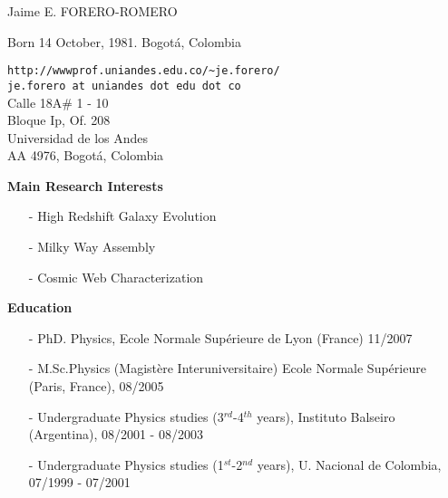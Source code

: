 \documentclass[9pt]{article}
\begin{document}
\noindent

\noindent
{{\Large Jaime E. FORERO-ROMERO}}\\
\begin{flushleft}
Born 14 October, 1981. Bogot\'a, Colombia\\
\end{flushleft}
\begin{flushright}
\verb"http://wwwprof.uniandes.edu.co/~je.forero/" \\{\tt{je.forero at uniandes dot edu dot co}}\\
Calle 18A\# 1 - 10\\
Bloque Ip, Of. 208\\
Universidad de los Andes\\
AA 4976, Bogot\'a, Colombia\\
\end{flushright}


{\bf Main Research Interests}
\begin{itemize}
\item[-]{High Redshift Galaxy Evolution}
\item[-]{Milky Way Assembly}
\item[-]{Cosmic Web Characterization}
\end{itemize}

{\bf Education}
\indent
\begin{itemize}
\item[-] PhD. Physics, Ecole Normale Sup\'erieure de Lyon (France) 11/2007
\item[-] M.Sc.Physics (Magistère Interuniversitaire)  Ecole Normale
  Sup\'erieure (Paris, France), 08/2005
\item[-] Undergraduate Physics studies (3$^{rd}$-4$^{th}$ years),
  Instituto Balseiro (Argentina), 08/2001 - 08/2003
\item[-] Undergraduate Physics studies (1$^{st}$-2$^{nd}$ years),
  U. Nacional de Colombia, 07/1999 -  07/2001
\end{itemize}
\end{document}
